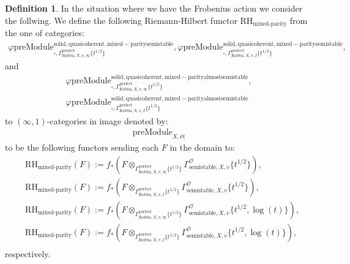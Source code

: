 \documentclass[12pt]{book}
\theoremstyle{definition}
\newtheorem{definition}{Definition}
\begin{document}
\begin{definition}
In the situation where we have the Frobenius action we consider the follwing. We define the following Riemann-Hilbert functor $\text{RH}_\text{mixed-parity}$ from the one of categories:
\begin{align}
\varphi\mathrm{preModule}^\mathrm{solid,quasicoherent,mixed-paritysemistable}_{\square,\Gamma^\mathrm{perfect}_{\text{Robba},X,v,\infty}\{t^{1/2}\}},
\varphi\mathrm{preModule}^\mathrm{solid,quasicoherent,mixed-paritysemistable}_{\square,\Gamma^\mathrm{perfect}_{\text{Robba},X,v,I}\{t^{1/2}\}}, 
\end{align}
and
\begin{align}
\varphi\mathrm{preModule}^\mathrm{solid,quasicoherent,mixed-parityalmostsemistable}_{\square,\Gamma^\mathrm{perfect}_{\text{Robba},X,v,\infty}\{t^{1/2}\}},\\
\varphi\mathrm{preModule}^\mathrm{solid,quasicoherent,mixed-parityalmostsemistable}_{\square,\Gamma^\mathrm{perfect}_{\text{Robba},X,v,I}\{t^{1/2}\}} 
\end{align}
to $(\infty,1)$-categories in image denoted by:
\begin{align}
\mathrm{preModule}_{X,\text{\'et}}
\end{align}
to be the following functors sending each $F$ in the domain to:
\begin{align}
&\text{RH}_\text{mixed-parity}(F):=f_*(F\otimes_{\Gamma^\mathrm{perfect}_{\text{Robba},X,v,\infty}\{t^{1/2}\}} \Gamma^\mathcal{O}_{\text{semistable},X,v}\{t^{1/2}\}),\\
&\text{RH}_\text{mixed-parity}(F):=f_*(F\otimes_{\Gamma^\mathrm{perfect}_{\text{Robba},X,v,I}\{t^{1/2}\}} \Gamma^\mathcal{O}_{\text{semistable},X,v}\{t^{1/2}\}),\\
&\text{RH}_\text{mixed-parity}(F):=f_*(F\otimes_{\Gamma^\mathrm{perfect}_{\text{Robba},X,v,\infty}\{t^{1/2}\}} \Gamma^\mathcal{O}_{\text{semistable},X,v}\{t^{1/2},\log(t)\}),\\
&\text{RH}_\text{mixed-parity}(F):=f_*(F\otimes_{\Gamma^\mathrm{perfect}_{\text{Robba},X,v,I}\{t^{1/2}\}} \Gamma^\mathcal{O}_{\text{semistable},X,v}\{t^{1/2},\log(t)\}),\\
\end{align}
respectively.

\end{definition}
\end{document}
